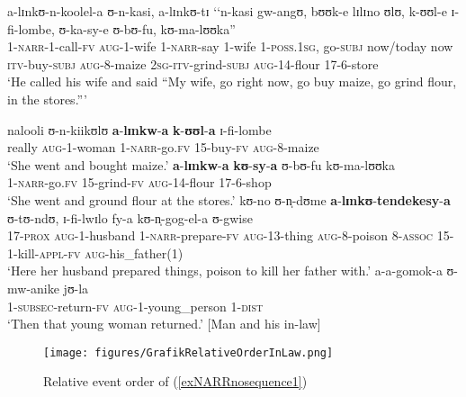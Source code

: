 \begin{exe}
\ex \label{exNARRnosequence1}
\begin{xlist}
\ex \label{exNARRnosequence1sentence1} \gll a-lɪnkʊ-n-koolel-a ʊ-n-kasi, a-lɪnkʊ-tɪ \textup{\lq\lq}n-kasi gw-angʊ, bʊʊk-e lɪlɪno ʊlʊ, k-ʊʊl-e ɪ-fi-lombe, ʊ-ka-sy-e ʊ-bʊ-fu, kʊ-ma-lʊʊka\textup{''}\\
1-\textsc{narr}-1-call-\textsc{fv} \textsc{aug}-1-wife 1-\textsc{narr}-say \phantom{\lq\lq}1-wife 1-\textsc{poss.1sg}, go-\textsc{subj} now/today now \textsc{itv}-buy-\textsc{subj} \textsc{aug}-8-maize \textsc{2sg}-\textsc{itv}-grind-\textsc{subj} \textsc{aug}-14-flour 17-6-store\\
\glt `He called his wife and said ``My wife, go right now, go buy maize, go grind flour, in the stores.''{}'

\ex \label{exNARRnosequence1sentence2} \gll nalooli ʊ-n-kiikʊlʊ \textbf{a}-\textbf{lɪnkw}-\textbf{a} \textbf{k}-\textbf{ʊʊl}-\textbf{a} ɪ-fi-lombe\\
really \textsc{aug}-1-woman 1-\textsc{narr}-go.\textsc{fv} 15-buy-\textsc{fv} \textsc{aug}-8-maize\\
\glt `She went and bought maize.'
\ex \label{exNARRnosequence1sentence3} \gll \textbf{a}-\textbf{lɪnkw}-\textbf{a} \textbf{kʊ}-\textbf{sy}-\textbf{a} ʊ-bʊ-fu kʊ-ma-lʊʊka\\
1-\textsc{narr}-go.\textsc{fv} 15-grind-\textsc{fv} \textsc{aug}-14-flour 17-6-shop\\
\glt `She went and ground flour at the stores.'
\ex \label{exNARRnosequence1sentence4} \gll kʊ-no ʊ-n̩-dʊme \textbf{a}-\textbf{lɪnkʊ}-\textbf{tendekesy}-\textbf{a} ʊ-tʊ-ndʊ, ɪ-fi-lwɪlo fy-a kʊ-n̩-gog-el-a ʊ-gwise\\
17-\textsc{prox} \textsc{aug}-1-husband 1-\textsc{narr}-prepare-\textsc{fv} \textsc{aug}-13-thing \textsc{aug}-8-poison 8-\textsc{assoc} 15-1-kill-\textsc{appl}-\textsc{fv} \textsc{aug}-his\_father(1)\\
\glt `Here her husband prepared things, poison to kill her father with.'
\ex \label{exNARRnosequence1sentence5} \gll a-a-gomok-a ʊ-mw-anike jʊ-la\\
1-\textsc{subsec}-return-\textsc{fv} \textsc{aug}-1-young\_person 1-\textsc{dist}\\
\glt `Then that young woman returned.' [Man and his in-law]
\end{xlist}
\end{exe}

\begin{figure}[hbt]
	\begin{center}
		\texttt{[image: figures/GrafikRelativeOrderInLaw.png]}
	\end{center}
	\caption{Relative event order of (\ref{exNARRnosequence1})}
	\label{FigureRelativeOrderInLaw}
\end{figure}

